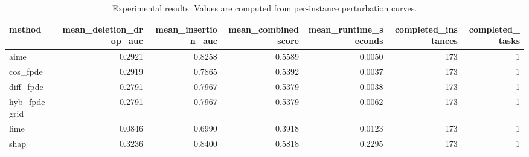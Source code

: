 \begin{table}[t]
\caption{Experimental results. Values are computed from per-instance perturbation curves.}
\label{tab:main_results_computed}
\centering
\begin{tabular}{lrrrrrr}
\toprule
method & mean\_deletion\_drop\_auc & mean\_insertion\_auc & mean\_combined\_score & mean\_runtime\_seconds & completed\_instances & completed\_tasks \\
\midrule
aime & 0.2921 & 0.8258 & 0.5589 & 0.0050 & 173 & 1 \\
cos\_fpde & 0.2919 & 0.7865 & 0.5392 & 0.0037 & 173 & 1 \\
diff\_fpde & 0.2791 & 0.7967 & 0.5379 & 0.0038 & 173 & 1 \\
hyb\_fpde\_grid & 0.2791 & 0.7967 & 0.5379 & 0.0062 & 173 & 1 \\
lime & 0.0846 & 0.6990 & 0.3918 & 0.0123 & 173 & 1 \\
shap & 0.3236 & 0.8400 & 0.5818 & 0.2295 & 173 & 1 \\
\bottomrule
\end{tabular}

\end{table}
